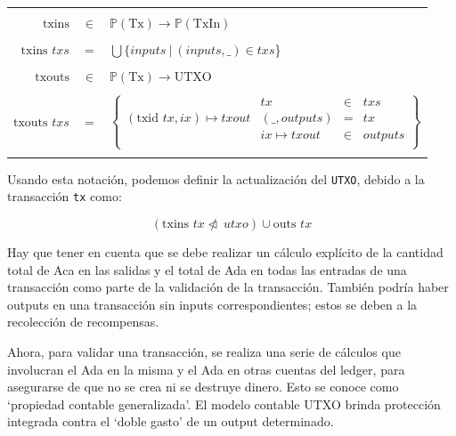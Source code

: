 \documentclass[12pt]{book}
\begin{document}
\begin{center}
	\begin{tabular}{|r c l|}
		\hline               &       &                                                             \\
		$\text{txins}$       & $\in$ & $\mathbb{P}(\text{Tx}) \rightarrow \mathbb{P}(\text{TxIn})$ \\&&\\

		$\text{txins } txs$  & =     & $\bigcup \{ inputs\ |\ (inputs, \_ ) \in txs$\}             \\&&\\

		$\text{txouts}$      & $\in$ & $\mathbb{P}(\text{Tx}) \rightarrow \text{UTXO}$             \\&&\\

		$\text{txouts } txs$ & =     &
		$\left \{
			\begin{array}{l|lcl}
				                                    & tx               & \in & txs     \\
				(\text{txid } tx, ix) \mapsto txout & (\_, outputs)    & =   & tx      \\
				                                    & ix \mapsto txout & \in & outputs \\
			\end{array}
		\right \} $                                                                                 \\&&\\
		\hline
	\end{tabular}
\end{center}

Usando esta notación, podemos definir la actualización del \texttt{UTXO}, debido a la transacción \texttt{tx} como:

\[ (\text{txins } tx\ntriangleleft\ utxo) \cup\text{outs } tx \]

Hay que tener en cuenta que se debe realizar un cálculo explícito de la cantidad total de Aca en las salidas y el total de Ada en todas las entradas de una transacción como parte de la validación de la transacción. También podría haber outputs en una transacción sin inputs correspondientes; estos se deben a la recolección de recompensas.

Ahora, para validar una transacción, se realiza una serie de cálculos que involucran el Ada en la misma y el Ada en otras cuentas del ledger, para asegurarse de que no se crea ni se destruye dinero. Esto se conoce como `propiedad contable generalizada'. El modelo contable UTXO brinda protección integrada contra el `doble gasto' de un output determinado.
\end{document}
